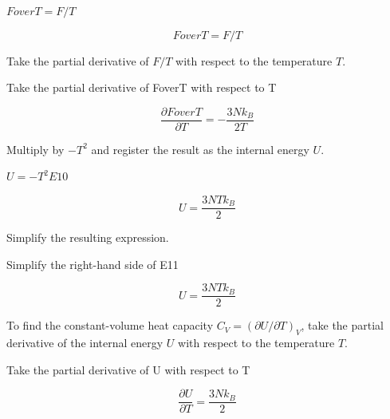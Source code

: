 \documentclass[dvipdfmx]{article}
\begin{document}
$FoverT = F / T$

\begin{equation}
  FoverT = F / T
  \label{eq:E9}
\end{equation}

Take the partial derivative of $F/T$ with respect to the temperature $T$.

Take the partial derivative of FoverT with respect to T

\begin{equation}
  \frac{\partial FoverT}{\partial T} = -\frac{3 N k_{B}}{2 T}
  \label{eq:E10}
\end{equation}

Multiply by $-T^2$ and register the result as the internal energy $U$.

$U = -T^2 E10$

\begin{equation}
  U = \frac{3 N T k_{B}}{2}
  \label{eq:E11}
\end{equation}

Simplify the resulting expression.

Simplify the right-hand side of E11

\begin{equation}
  U = \frac{3 N T k_{B}}{2}
  \label{eq:E12}
\end{equation}

To find the constant-volume heat capacity $C_V=(\partial U/\partial T)_V$, take the partial derivative of the internal energy $U$ with respect to the temperature $T$.

Take the partial derivative of U with respect to T

\begin{equation}
  \frac{\partial U}{\partial T} = \frac{3 N k_{B}}{2}
  \label{eq:E13}
\end{equation}
\end{document}
